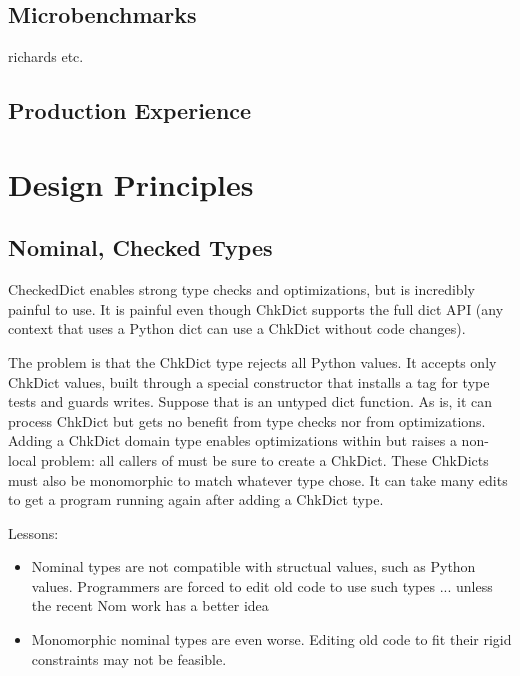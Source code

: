 \documentclass[a4paper,english,cleveref,autoref,thm-restate,anonymous,]{lipics-v2021}
\begin{document}
\subsection{Microbenchmarks}

richards etc.


\subsection{Production Experience}


\section{Design Principles}

\subsection{Nominal, Checked Types}

CheckedDict enables strong type checks and optimizations, but is incredibly painful to use.
It is painful even though ChkDict supports the full dict API
(any context that uses a Python dict can use a ChkDict without code changes).

The problem is that the ChkDict type rejects all Python values.
It accepts only ChkDict values, built through a special constructor
that installs a tag for type tests and guards writes.
Suppose that  is an untyped dict function.
As is, it can process ChkDict but gets no benefit from type checks nor from optimizations.
Adding a ChkDict domain type enables optimizations within  but raises a non-local
problem: all callers of  must be sure to create a ChkDict.
These ChkDicts must also be monomorphic to match whatever type  chose.
It can take many edits to get a program running again after adding a ChkDict type.

Lessons:
\begin{itemize}
  \item
    Nominal types are not compatible with structual values, such as Python values.
    Programmers are forced to edit old code to use such types ... unless the recent Nom work has a better idea~\cite{mt-oopsla-2021}
  \item
    Monomorphic nominal types are even worse.
    Editing old code to fit their rigid constraints may not be feasible.

\end{itemize}
\end{document}
